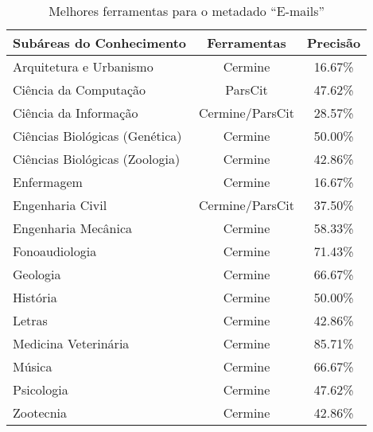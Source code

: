 \begin{table}
    \caption{Melhores ferramentas para o metadado ``E-mails''}
    \begin{center}
        \begin{tabular}{|l|c|c|}
            \hline 
            \textbf{Subáreas do Conhecimento} & \textbf{Ferramentas} & \textbf{Precisão} \\ 
            \hline 
            Arquitetura e Urbanismo & Cermine & 16.67\% \\ \hline
            Ciência da Computação & ParsCit & 47.62\% \\ \hline
            Ciência da Informação & Cermine/ParsCit & 28.57\% \\ \hline
            Ciências Biológicas (Genética) & Cermine & 50.00\% \\ \hline
            Ciências Biológicas (Zoologia) & Cermine & 42.86\% \\ \hline
            Enfermagem & Cermine & 16.67\% \\ \hline
            Engenharia Civil & Cermine/ParsCit & 37.50\% \\ \hline
            Engenharia Mecânica & Cermine & 58.33\% \\ \hline
            Fonoaudiologia & Cermine & 71.43\% \\ \hline
            Geologia & Cermine & 66.67\% \\ \hline
            História & Cermine & 50.00\% \\ \hline
            Letras & Cermine & 42.86\% \\ \hline
            Medicina Veterinária & Cermine & 85.71\% \\ \hline
            Música & Cermine & 66.67\% \\ \hline
            Psicologia & Cermine & 47.62\% \\ \hline
            Zootecnia & Cermine & 42.86\% \\ \hline
        \end{tabular}
    \end{center}
    \label{tab:areas-emails-tools}
\end{table}

